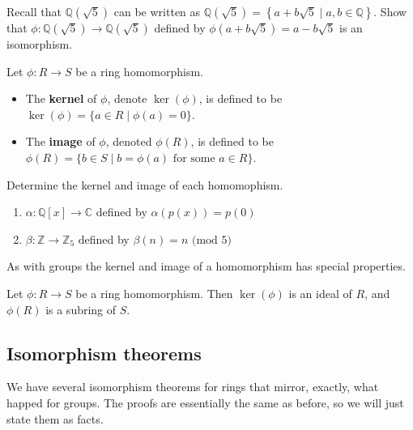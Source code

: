 \begin{problem}
Recall that $\mathbb{Q}\left(\sqrt{5}\right)$ can be written as $\mathbb{Q}\left(\sqrt{5}\right) = \left\{a+b\sqrt{5}\mid a,b\in \mathbb{Q}\right\}$. Show that $\phi:\mathbb{Q}\left(\sqrt{5}\right) \rightarrow \mathbb{Q}\left(\sqrt{5}\right)$ defined by $\phi(a+b\sqrt{5}) = a-b\sqrt{5}$ is an isomorphism.
\end{problem}

\begin{definition}
Let $\phi:R\to S$ be a ring homomorphism. 
\begin{itemize}
\item The \textbf{kernel} of $\phi$, denote $\ker(\phi)$, is defined to be $\ker(\phi)=\{a\in R\mid \phi(a)=0\}$. 
\item The \textbf{image} of $\phi$, denoted  $\phi(R)$, is defined to be $\phi(R)=\{b\in S\mid b=\phi(a) \text{ for some $a\in R$}\}$.
\end{itemize}
\end{definition}

\begin{problem}
Determine the kernel and image of each homomophism.
\begin{enumerate}
\item $\alpha: \mathbb{Q}[x] \rightarrow \mathbb{C}$ defined by $\alpha(p(x)) = p(0)$
\item $\beta: \mathbb{Z} \rightarrow \mathbb{Z}_5$ defined by $\beta(n) = n \text{ (mod $5$)}$
\end{enumerate}
\end{problem}

As with groups the kernel and image of a homomorphism has special properties. 

\begin{theorem}
Let $\phi:R\to S$ be a ring homomorphism. Then $\ker(\phi)$ is an ideal of $R$, and $\phi(R)$ is a subring of $S$.
\end{theorem}

\subsection{Isomorphism theorems}

We have several isomorphism theorems for rings that mirror, exactly, what happed for groups. The proofs are essentially the same as before, so we will just state them as facts.

